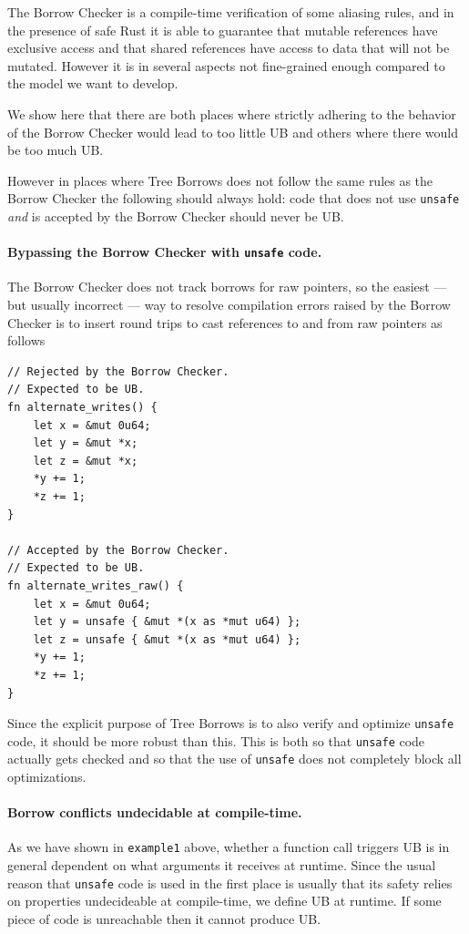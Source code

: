 \documentclass[a4paper,11pt]{article}
\theoremstyle{plain}
\theoremstyle{definition}
\theoremstyle{remark}
\newcommand{\tcode}[1]{\texttt{#1}}
\begin{document}
The Borrow Checker is a compile-time verification of some aliasing rules, and
in the presence of safe Rust it is able to guarantee that mutable references
have exclusive access and that shared references have access to data that will
not be mutated. However it is in several aspects not fine-grained enough compared
to the model we want to develop.

We show here that there are both places where strictly adhering to the behavior
of the Borrow Checker would lead to too little UB and others where there would
be too much UB.

However in places where Tree Borrows does not follow the same rules as the
Borrow Checker the following should always hold: code that does not use
\tcode{unsafe} \textit{and} is accepted by the Borrow Checker should never
be UB.

\paragraph*{Bypassing the Borrow Checker with \texttt{unsafe} code.}
The Borrow Checker does not track borrows for raw pointers, so the easiest
--- but usually incorrect --- way to resolve compilation errors raised by the
Borrow Checker is to insert round trips to cast references to and from raw
pointers as follows
\begin{lstlisting}
// Rejected by the Borrow Checker.
// Expected to be UB.
fn alternate_writes() {
    let x = &mut 0u64;
    let y = &mut *x;
    let z = &mut *x;
    *y += 1;
    *z += 1;
}

// Accepted by the Borrow Checker.
// Expected to be UB.
fn alternate_writes_raw() {
    let x = &mut 0u64;
    let y = unsafe { &mut *(x as *mut u64) };
    let z = unsafe { &mut *(x as *mut u64) };
    *y += 1;
    *z += 1;
}
\end{lstlisting}

Since the explicit purpose of Tree Borrows is to also verify and optimize
\tcode{unsafe} code, it should be more robust than this. This is both so that
\tcode{unsafe} code actually gets checked and so that the use of \tcode{unsafe}
does not completely block all optimizations.

\paragraph*{Borrow conflicts undecidable at compile-time.}
As we have shown in \tcode{example1} above, whether a function call triggers
UB is in general dependent on what arguments it receives at runtime. Since the
usual reason that \tcode{unsafe} code is used in the first place is usually
that its safety relies on properties undecideable at compile-time, we define
UB at runtime. If some piece of code is unreachable then it cannot produce UB.
\end{document}
